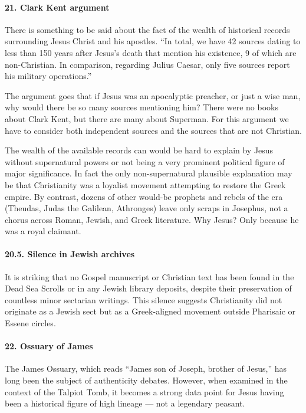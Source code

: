 \paragraph{21.
Clark Kent argument}\label{par:clark-kent-argument}

There is something to be said about the fact of the wealth of historical records surrounding Jesus Christ and his apostles.
``In total, we have 42 sources dating to less than 150 years after Jesus's death that mention his existence, 9 of which are non-Christian.
In comparison, regarding Julius Caesar, only five sources report his military operations.''

The argument goes that if Jesus was an apocalyptic preacher, or just a wise man, why would there be so many sources mentioning him?
There were no books about Clark Kent, but there are many about Superman.
For this argument we have to consider both independent sources and the sources that are not Christian.

The wealth of the available records can would be hard to explain by Jesus without supernatural powers or not being a very prominent political figure of major significance.
In fact the only non-supernatural plausible explanation may be that Christianity was a loyalist movement attempting to restore the Greek empire.
By contrast, dozens of other would-be prophets and rebels of the era (Theudas, Judas the Galilean, Athronges) leave only scraps in Josephus, not a chorus across Roman, Jewish, and Greek literature. Why Jesus? Only because he was a royal claimant.

\paragraph{20.5.
Silence in Jewish archives}\label{par:silence-in-jewish-archives}

It is striking that no Gospel manuscript or Christian text has been found in the Dead Sea Scrolls or in any Jewish library deposits, despite their preservation of countless minor sectarian writings. This silence suggests Christianity did not originate as a Jewish sect but as a Greek-aligned movement outside Pharisaic or Essene circles.

\paragraph{22.
Ossuary of James}\label{par:ossuary-of-james}

The James Ossuary, which reads ``James son of Joseph, brother of Jesus,'' has long been the subject of authenticity debates.
However, when examined in the context of the Talpiot Tomb, it becomes a strong data point for Jesus having been a historical figure of high lineage --- not a legendary peasant.

